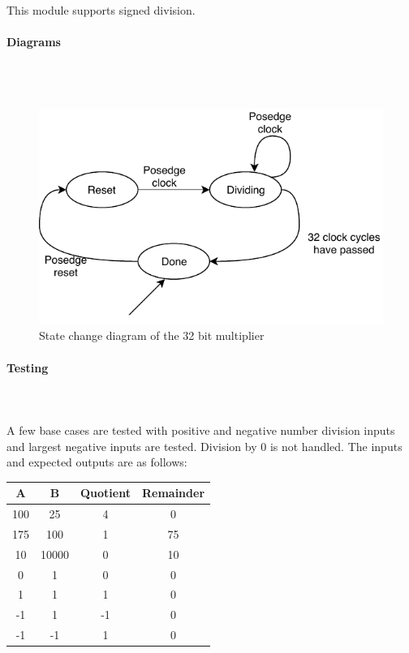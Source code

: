 \documentclass{article}
\begin{document}
    This module supports signed division.

    \paragraph{Diagrams}
    \hfill\\\\
    \begin{figure}[H]
        \centering
        \includegraphics{../diagrams/alu/divider/divider_32.pdf}
        \caption{State change diagram of the 32 bit multiplier}
    \end{figure}

    \paragraph{Testing}
    \hfill\\\\
    A few base cases are tested with positive and negative number
    division inputs and largest negative inputs are tested. Division by 0 is not
    handled. The inputs and expected
    outputs are as follows:

    \begin{center}
        \begin{tabular}{|c|c||c|c|}
            \hline
            A & B & Quotient & Remainder
            \\\hline\hline
            100 & 25 & 4 & 0
            \\\hline
            175 & 100 & 1 & 75
            \\\hline
            10 & 10000 & 0 & 10
            \\\hline
            0 & 1 & 0 & 0
            \\\hline
            1 & 1 & 1 & 0
            \\\hline
            -1 & 1 & -1 & 0
            \\\hline
            -1 & -1 & 1 & 0
            \\\hline
        \end{tabular}
    \end{center}
\end{document}
